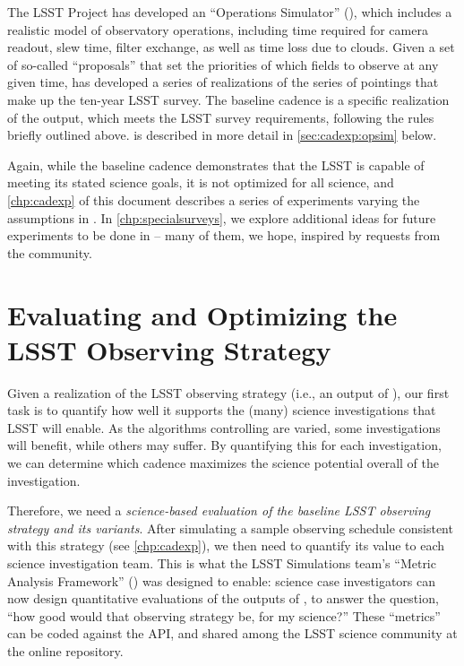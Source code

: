 The LSST Project has developed an ``Operations Simulator'' (\OpSim),
which
includes a realistic model of observatory operations, including time
required for camera readout, slew time, filter exchange, as well as time
loss due to clouds.  Given a set of so-called ``proposals''
that set the priorities of which fields to
observe at any given time, \OpSim has developed a series of realizations
of the series of pointings that make up the ten-year LSST survey.
The baseline cadence is a specific realization of the
\OpSim output, which meets the LSST survey requirements, following the
rules briefly outlined above. \OpSim is described in more detail in \autoref{sec:cadexp:opsim} below.

Again, while the baseline cadence demonstrates that the LSST is capable
of meeting its stated science goals, it is not optimized for all
science, and \autoref{chp:cadexp} of this document describes a
series of experiments varying the assumptions in \OpSim.  In
\autoref{chp:specialsurveys}, we explore additional ideas for future
experiments to be done in \OpSim -- many of them, we hope, inspired by
requests from the community.

\navigationbar


\section{Evaluating and Optimizing the LSST Observing Strategy}
\def\secname{intro:evaluation}\label{sec:\secname}


Given a realization of the LSST observing strategy (i.e., an output of
\OpSim), our first task is to quantify how well it supports the (many)
science investigations that LSST will enable.  As the algorithms controlling
\OpSim are varied, some investigations will benefit, while others may suffer.
By quantifying this for each investigation, we can determine which cadence
maximizes the science potential overall of the investigation.

Therefore, we need a {\it science-based evaluation of the baseline LSST
observing strategy and its variants}. After simulating a sample
observing schedule consistent with this strategy (see
\autoref{chp:cadexp}), we then need to quantify its value to each
science investigation team.  This is what the LSST Simulations team's ``Metric
Analysis Framework'' (\MAF) was designed to enable: science case investigators
can now design quantitative evaluations of the outputs of \OpSim, to
answer the question, ``how good would that observing strategy be, for my
science?'' These ``metrics'' can be coded against the \MAF API, and
shared among the LSST science community at the
\href{https://sims-maf.lsst.io/metricList.html#contributed-mafcontrib-metrics}{\simsMafContrib}
online repository.


